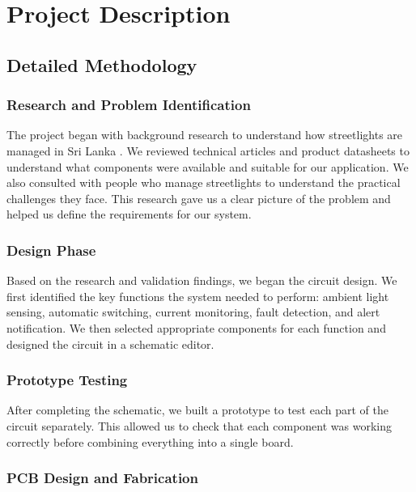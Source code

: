 \documentclass{article}
\begin{document}
\section{Project Description}

\subsection{Detailed Methodology}

\subsubsection{Research and Problem Identification}

The project began with background research to understand how streetlights are managed in Sri Lanka . We reviewed technical articles and product datasheets to understand what components were available and suitable for our application. We also consulted with people who manage streetlights to understand the practical challenges they face. This research gave us a clear picture of the problem and helped us define the requirements for our system.



\subsubsection{Design Phase}

Based on the research and validation findings, we began the circuit design. We first identified the key functions the system needed to perform: ambient light sensing, automatic switching, current monitoring, fault detection, and alert notification. We then selected appropriate components for each function and designed the circuit in a schematic editor.

\subsubsection{Prototype Testing}

After completing the schematic, we built a prototype to test each part of the circuit separately. This allowed us to check that each component was working correctly before combining everything into a single board.

\subsubsection{PCB Design and Fabrication}
\end{document}
